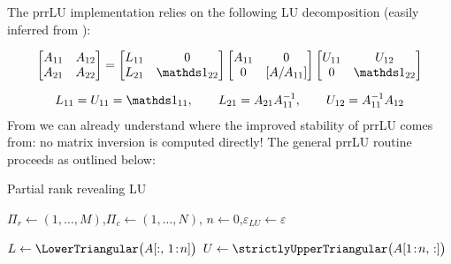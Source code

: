 The prrLU implementation relies on the following LU decomposition (easily inferred from ):

\begin{gather}
	\label{eq:SchurLU}
	\begin{bmatrix}
	A_{11} & A_{12} \\
	A_{21} & A_{22}
	\end{bmatrix}
	=
	\begin{bmatrix}
	L_{11} & 0 \\
	L_{21} & \identity_{22}
	\end{bmatrix}
	\begin{bmatrix}
	A_{11} & 0 \\
	0 & [A / A_{11}]
	\end{bmatrix}
	\begin{bmatrix}
	U_{11} & U_{12} \\
	0 & \identity_{22}
	\end{bmatrix}\\[6pt]
	\nonumber L_{11} = U_{11} = \identity_{11}, \qquad L_{21} = A_{21}A^{-1}_{11}, \qquad U_{12} = A^{-1}_{11}A_{12}
\end{gather} 
From  we can already understand where the improved stability of prrLU comes from: no matrix inversion is computed directly! The general prrLU routine proceeds as outlined below:  

\begin{algorithm}[H]
	\caption{Partial rank revealing LU}
	\label{alg:prrLU}


    $\Pi_r\leftarrow(1,\dots,M)$,\quad $\Pi_c\leftarrow(1,\dots,N)$,\quad 
	$n\leftarrow0$,\quad $\varepsilon_{LU} \leftarrow \varepsilon$\;

	
	$L\leftarrow\LowerTriangular\bigl(A[:,\,1\!:\!n]\bigr)$\;
	$U\leftarrow\strictlyUpperTriangular\bigl(A[1\!:\!n,\,:]\bigr)$\;
	\;
\end{algorithm}

